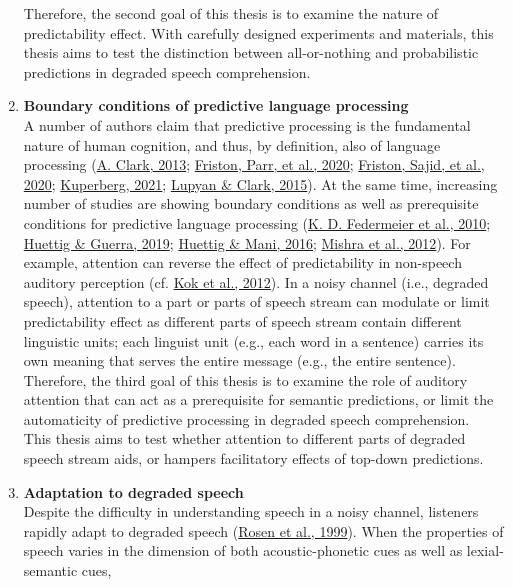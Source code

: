 \documentclass[a4paper, nobind]{templates/ociamthesis}
\begin{document}
\begin{enumerate}
  Therefore, the second goal of this thesis is to examine the nature of predictability effect.
  With carefully designed experiments and materials, this thesis aims to test the distinction between all-or-nothing and probabilistic predictions in degraded speech comprehension.
\item
  \textbf{Boundary conditions of predictive language processing}\\
  A number of authors claim that predictive processing is the fundamental nature of human cognition, and thus, by definition, also of language processing (\protect\hyperlink{ref-Clark2013}{A. Clark, 2013}; \protect\hyperlink{ref-Friston2020}{Friston, Parr, et al., 2020}; \protect\hyperlink{ref-Friston2020b}{Friston, Sajid, et al., 2020}; \protect\hyperlink{ref-Kuperberg2020}{Kuperberg, 2021}; \protect\hyperlink{ref-Lupyan2015}{Lupyan \& Clark, 2015}).
  At the same time, increasing number of studies are showing boundary conditions as well as prerequisite conditions for predictive language processing (\protect\hyperlink{ref-Federmeier2010}{K. D. Federmeier et al., 2010}; \protect\hyperlink{ref-Huettig2019}{Huettig \& Guerra, 2019}; \protect\hyperlink{ref-Huettig2016}{Huettig \& Mani, 2016}; \protect\hyperlink{ref-Mishra2012}{Mishra et al., 2012}).
  For example, attention can reverse the effect of predictability in non-speech auditory perception (cf. \protect\hyperlink{ref-Kok2012}{Kok et al., 2012}).
  In a noisy channel (i.e., degraded speech), attention to a part or parts of speech stream can modulate or limit predictability effect as different parts of speech stream contain different linguistic units;
  each linguist unit (e.g., each word in a sentence) carries its own meaning that serves the entire message (e.g., the entire sentence).
  Therefore, the third goal of this thesis is to examine the role of auditory attention that can act as a prerequisite for semantic predictions,
  or limit the automaticity of predictive processing in degraded speech comprehension.\\
  This thesis aims to test whether attention to different parts of degraded speech stream aids, or hampers facilitatory effects of top-down predictions.
\item
  \textbf{Adaptation to degraded speech}\\
  Despite the difficulty in understanding speech in a noisy channel,
  listeners rapidly adapt to degraded speech (\protect\hyperlink{ref-Rosen1999}{Rosen et al., 1999}).
  When the properties of speech varies in the dimension of both acoustic-phonetic cues as well as lexial-semantic cues,

\end{enumerate}
\end{document}
